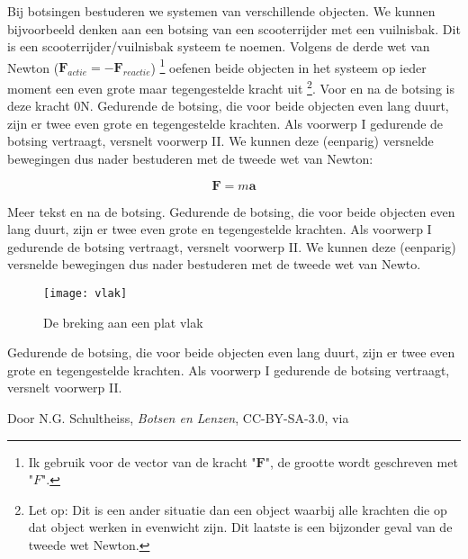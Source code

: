 Bij botsingen bestuderen we systemen van verschillende objecten. We
kunnen bij\-voorbeeld denken aan een botsing van een scooterrijder met
een vuilnisbak. Dit is een scooterrijder/vuilnisbak systeem te noemen.
Volgens de derde wet van Newton
($\mathbf{F}_{actie}=-\mathbf{F}_{reactie}$) \footnote{Ik gebruik voor
de vector van de kracht "$\mathbf{F}$", de grootte wordt geschreven met
"$F$".} oefenen beide objecten in het systeem op ieder moment een even
grote maar tegengestelde kracht uit \footnote{Let op: Dit is een ander
situatie dan een object waarbij alle krachten die op dat object werken
in evenwicht zijn. Dit laatste is een bijzonder geval van de tweede wet
Newton.}. Voor en na de botsing is deze kracht 0N. Gedurende de botsing,
die voor beide objecten even lang duurt, zijn er twee even grote en
tegengestelde krachten. Als voorwerp I gedurende de botsing vertraagt,
versnelt voorwerp II. We kunnen deze (eenparig) versnelde bewegingen dus
nader bestuderen met de tweede wet van Newton:

\begin{equation}
    \mathbf{F}=m\mathbf{a}
\end{equation}

Meer tekst en na de botsing. Gedurende de botsing, die voor beide
objecten even lang duurt, zijn er twee even grote en tegengestelde
krachten. Als voorwerp I gedurende de botsing vertraagt, versnelt
voorwerp II. We kunnen deze (eenparig) versnelde bewegingen dus nader
bestuderen met de tweede wet van Newto.

\begin{figure}[H]
    \centering
    \texttt{[image: vlak]}
    \caption{De breking aan een plat vlak}\label{fig:vlak}
\end{figure}

Gedurende de botsing, die voor beide objecten even lang duurt, zijn er
twee even grote en tegengestelde krachten. Als voorwerp I gedurende de
botsing vertraagt, versnelt voorwerp II.

\begin{thebibliography}{9}
        Door N.G. Schultheiss, \emph{Botsen en Lenzen}, CC-BY-SA-3.0, via \hisparc
\end{thebibliography}


